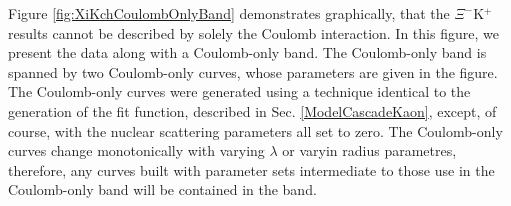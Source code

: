 \documentclass[/home/jesse/Analysis/FemtoAnalysis/AnalysisNotes/AnalysisNoteJBuxton.tex]{subfiles}
\begin{document}

Figure \ref{fig:XiKchCoulombOnlyBand} demonstrates graphically, that the $\Xi^{-}$K$^{+}$ results cannot be described by solely the Coulomb interaction.  In this figure, we present the data along with a Coulomb-only band.  The Coulomb-only band is spanned by two Coulomb-only curves, whose parameters are given in the figure. The Coulomb-only curves were generated using a technique identical to the generation of the fit function, described in Sec. \ref{ModelCascadeKaon}, except, of course, with the nuclear scattering parameters all set to zero.  The Coulomb-only curves change monotonically with varying $\lambda$ or varyin radius parametres, therefore, any curves built with parameter sets intermediate to those use in the Coulomb-only band will be contained in the band.
\end{document}
